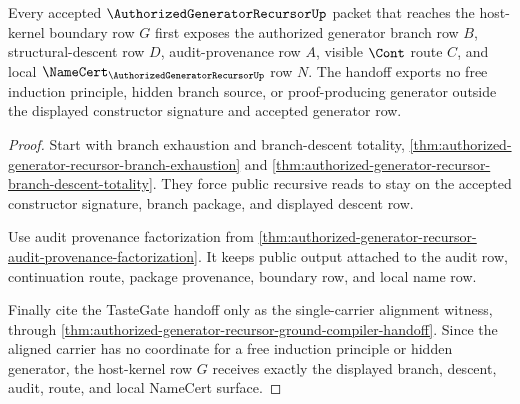 \begin{theorem}
\label{thm:authorized-generator-recursor-host-kernel-handoff}
Every accepted $\AuthorizedGeneratorRecursorUp$ packet that reaches the host-kernel boundary row $G$ first exposes the authorized generator branch row $B$, structural-descent row $D$, audit-provenance row $A$, visible $\Cont$ route $C$, and local $\NameCert_{\AuthorizedGeneratorRecursorUp}$ row $N$. The handoff exports no free induction principle, hidden branch source, or proof-producing generator outside the displayed constructor signature and accepted generator row.
\end{theorem}
\begin{proof}
Start with branch exhaustion and branch-descent totality, \autoref{thm:authorized-generator-recursor-branch-exhaustion} and \autoref{thm:authorized-generator-recursor-branch-descent-totality}. They force public recursive reads to stay on the accepted constructor signature, branch package, and displayed descent row.

Use audit provenance factorization from \autoref{thm:authorized-generator-recursor-audit-provenance-factorization}. It keeps public output attached to the audit row, continuation route, package provenance, boundary row, and local name row.

Finally cite the TasteGate handoff only as the single-carrier alignment witness, through \autoref{thm:authorized-generator-recursor-ground-compiler-handoff}. Since the aligned carrier has no coordinate for a free induction principle or hidden generator, the host-kernel row $G$ receives exactly the displayed branch, descent, audit, route, and local NameCert surface.
\end{proof}

